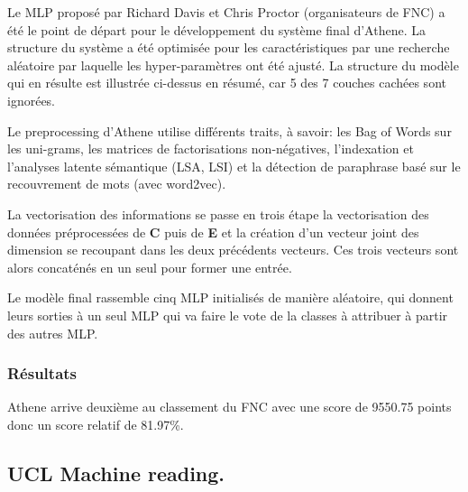 \documentclass[11pt,a4paper,oldfontcommands]{memoir}
\begin{document}
Le MLP proposé par Richard Davis et Chris Proctor (organisateurs de FNC) a été le point de départ pour le développement du
système final d'Athene.
La structure du système a été optimisée pour les
caractéristiques par une recherche aléatoire par laquelle les hyper-paramètres ont
été ajusté.
La structure du modèle qui en résulte est illustrée ci-dessus en résumé, car 5 des 7 couches cachées sont ignorées.

Le preprocessing d'Athene utilise différents traits, à savoir: les Bag of Words sur les uni-grams, les matrices de factorisations non-négatives, l'indexation et l'analyses latente sémantique (LSA, LSI) et la détection de paraphrase basé sur le recouvrement de mots (avec word2vec).

La vectorisation des informations se passe en trois étape la vectorisation des données préprocessées de \textbf{C} puis de \textbf{E} et la création d'un vecteur joint des dimension se recoupant dans les deux précédents vecteurs.
Ces trois vecteurs sont alors concaténés en un seul pour former une entrée.

Le modèle final rassemble cinq MLP initialisés de manière aléatoire, qui donnent leurs sorties à un seul MLP qui va faire le vote de la classes à attribuer à partir des autres MLP.
\subsubsection{Résultats}
Athene arrive deuxième au classement du FNC avec une score de 9550.75 points donc un score relatif de 81.97\%.


\subsection{UCL Machine reading.}
\end{document}
